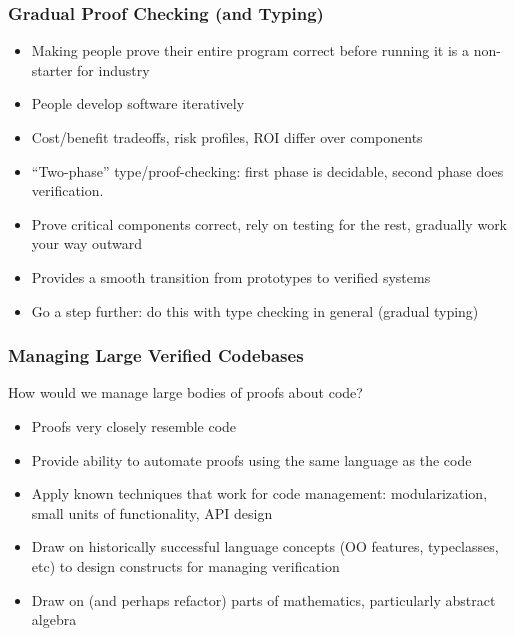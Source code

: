 \documentclass{beamer}
\begin{document}
\begin{frame}
  \frametitle{Gradual Proof Checking (and Typing)}
  \begin{itemize}
    \item Making people prove their entire program correct before running
      it is a non-starter for industry
    \item People develop software iteratively
    \item Cost/benefit tradeoffs, risk profiles, ROI differ over components
    \item ``Two-phase'' type/proof-checking: first phase is decidable,
      second phase does verification.
    \item Prove critical components correct, rely on testing for the
      rest, gradually work your way outward
    \item Provides a smooth transition from prototypes to verified
      systems
    \item Go a step further: do this with type checking in general
      (gradual typing)
  \end{itemize}
\end{frame}

\begin{frame}
  \frametitle{Managing Large Verified Codebases}
  How would we manage large bodies of proofs about code?
  \begin{itemize}
    \item Proofs very closely resemble code
    \item Provide ability to automate proofs using the same language
      as the code
    \item Apply known techniques that work for code management:
      modularization, small units of functionality, API design
    \item Draw on historically successful language concepts (OO
      features, typeclasses, etc) to design constructs for managing
      verification
    \item Draw on (and perhaps refactor) parts of mathematics,
      particularly abstract algebra
  \end{itemize}
\end{frame}
\end{document}
